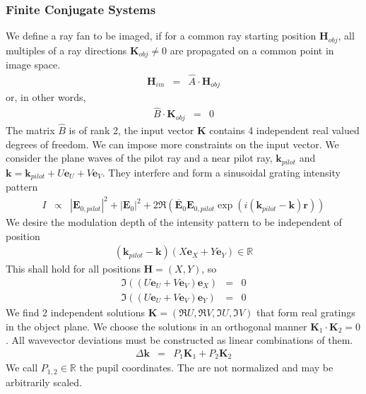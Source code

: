 \documentclass[12pt,a4paper,twoside,openright,BCOR10mm,headsepline,titlepage,abstracton,chapterprefix,final]{scrreprt}
\newcommand\Vector[1]{{\mathbf{#1}}}
\newcommand\Location{\Vector{r}}
\newcommand\wavenumber{k}
\newcommand\Wavevector{\Vector{\wavenumber}}
\newcommand\scalarEfield{E}
\newcommand\Efield{\Vector{\scalarEfield}}
\begin{document}
\subsubsection{Finite Conjugate Systems}
We define a ray fan to be imaged, 
if for a common ray starting position $\Vector{H}_{obj}$, all multiples of a
ray directions $\Vector{K}_{obj} \neq 0$ are propagated on a common point in image space.
\begin{eqnarray}
 \Vector{H}_{im} &=& \hat{A} \cdot \Vector{H}_{obj}
\end{eqnarray}
or, in other words,
\begin{eqnarray}
 \hat{B} \cdot \Vector{K}_{obj} &=& 0
\end{eqnarray}
The matrix $\hat{B}$ is of rank 2, the input vector $\Vector{K}$ contains 4 independent real valued degrees of freedom.
We can impose more constraints on the input vector. 
We consider the plane waves of the pilot ray and a near pilot ray, 
$\Wavevector_{pilot}$ and $\Wavevector = \Wavevector_{pilot} + U \Vector{e}_U + V \Vector{e}_V$.
They interfere and form a sinusoidal grating intensity pattern
\begin{eqnarray}
 I &\propto& |\Efield_{0,pilot}|^2 + |\Efield_{0}|^2 + 2 \Re \left( \overline{\Efield}_{0}\Efield_{0,pilot} \exp(i(\Wavevector_{pilot} - \Wavevector)\Location) \right)
\end{eqnarray}
We desire the modulation depth of the intensity pattern to be independent of position
\begin{eqnarray}
 (\Wavevector_{pilot} - \Wavevector)(X \Vector{e}_X + Y \Vector{e}_Y) \in \mathbb{R} \label{eq:xyuvRealGratingConstraint}
\end{eqnarray}
This shall hold for all positions $\Vector{H}=(X,Y)$, so
\begin{eqnarray}
 \Im ( (U \Vector{e}_U + V \Vector{e}_V) \Vector{e}_X ) &=& 0 \\
 \Im ( (U \Vector{e}_U + V \Vector{e}_V) \Vector{e}_Y ) &=& 0
\end{eqnarray}
We find 2 independent solutions $\Vector{K} = (\Re U, \Re V, \Im U, \Im V)$ that form real gratings in the object plane.
We choose the solutions in an orthogonal manner $\Vector{K}_1 \cdot \Vector{K}_2 = 0$.
All wavevector deviations must be constructed as linear combinations of them.
\begin{eqnarray}
 \Delta \Wavevector &=& P_1 \Vector{K}_1 + P_2 \Vector{K}_2
\end{eqnarray}
We call $P_{1,2} \in \mathbb{R}$ the pupil coordinates. The are not normalized and may be arbitrarily scaled.
\end{document}
